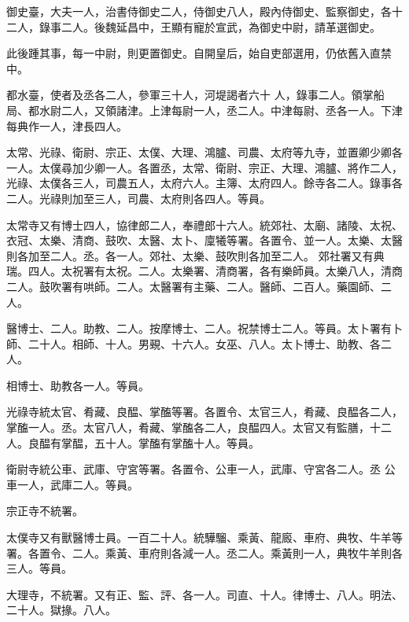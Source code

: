 \begin{pinyinscope}
 御史臺，大夫一人，治書侍御史二人，侍御史八人，殿內侍御史、監察御史，各十二人，錄事二人。後魏延昌中，王顯有寵於宣武，為御史中尉，請革選御史。



 此後踵其事，每一中尉，則更置御史。自開皇后，始自吏部選用，仍依舊入直禁中。



 都水臺，使者及丞各二人，參軍三十人，河堤謁者六十
 人，錄事二人。領掌船局、都水尉二人，又領諸津。上津每尉一人，丞二人。中津每尉、丞各一人。下津每典作一人，津長四人。



 太常、光祿、衛尉、宗正、太僕、大理、鴻臚、司農、太府等九寺，並置卿少卿各一人。太僕尋加少卿一人。各置丞，太常、衛尉、宗正、大理、鴻臚、將作二人，光祿、太僕各三人，司農五人，太府六人。主簿、太府四人。餘寺各二人。錄事各二人。光祿則加至三人，司農、太府則各四人。等員。



 太常寺又有博士四人，協律郎二人，奉禮郎十六人。統郊社、太廟、諸陵、太祝、衣冠、太樂、清商、鼓吹、太醫、太卜、廩犧等署。各置令、並一人。太樂、太醫則各加至二人。丞。各一人。郊社、太樂、鼓吹則各加至二人。
 郊社署又有典瑞。四人。太祝署有太祝。二人。太樂署、清商署，各有樂師員。太樂八人，清商二人。鼓吹署有哄師。二人。太醫署有主藥、二人。醫師、二百人。藥園師、二人。



 醫博士、二人。助教、二人。按摩博士、二人。祝禁博士二人。等員。太卜署有卜師、二十人。相師、十人。男覡、十六人。女巫、八人。太卜博士、助教、各二人。



 相博士、助教各一人。等員。



 光祿寺統太官、肴藏、良醖、掌醢等署。各置令、太官三人，肴藏、良醖各二人，掌醢一人。丞。太官八人，肴藏、掌醢各二人，良醖四人。太官又有監膳，十二人。良醖有掌醖，五十人。掌醢有掌醢十人。等員。



 衛尉寺統公車、武庫、守宮等署。各置令、公車一人，武庫、守宮各二人。丞
 公車一人，武庫二人。等員。



 宗正寺不統署。



 太僕寺又有獸醫博士員。一百二十人。統驊騮、乘黃、龍廄、車府、典牧、牛羊等署。各置令、二人。乘黃、車府則各減一人。丞二人。乘黃則一人，典牧牛羊則各三人。等員。



 大理寺，不統署。又有正、監、評、各一人。司直、十人。律博士、八人。明法、二十人。獄掾。八人。




\end{pinyinscope}
